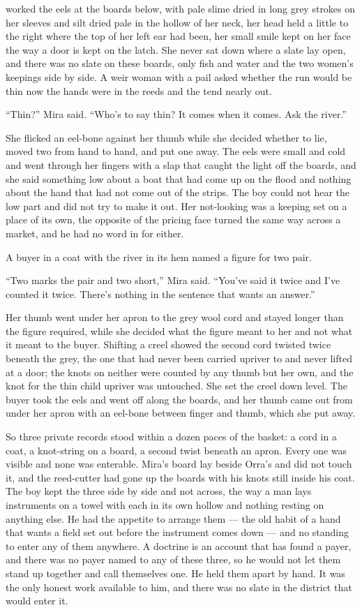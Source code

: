  worked the eels at the boards below, with pale slime dried in long grey strokes on her sleeves and silt dried pale in the hollow of her neck, her head held a little to the right where the top of her left ear had been, her small smile kept on her face the way a door is kept on the latch. She never sat down where a slate lay open, and there was no slate on these boards, only fish and water and the two women's keepings side by side. A weir woman with a pail asked whether the run would be thin now the hands were in the reeds and the tend nearly out.

“Thin?” Mira said. “Who's to say thin? It comes when it comes. Ask the river.”

She flicked an eel-bone against her thumb while she decided whether to lie, moved two from hand to hand, and put one away. The eels were small and cold and went through her fingers with a slap that caught the light off the boards, and she said something low about a boat that had come up on the flood and nothing about the hand that had not come out of the strips. The boy could not hear the low part and did not try to make it out. Her not-looking was a keeping set on a place of its own, the opposite of the pricing face turned the same way across a market, and he had no word in  for either.

A buyer in a coat with the river in its hem named a figure for two pair.

“Two marks the pair and two short,” Mira said. “You've said it twice and I've counted it twice. There's nothing in the sentence that wants an answer.”

Her thumb went under her apron to the grey wool cord and stayed longer than the figure required, while she decided what the figure meant to her and not what it meant to the buyer. Shifting a creel showed the second cord twisted twice beneath the grey, the one that had never been carried upriver to  and never lifted at a door; the knots on neither were counted by any thumb but her own, and the knot for the thin child upriver was untouched. She set the creel down level. The buyer took the eels and went off along the boards, and her thumb came out from under her apron with an eel-bone between finger and thumb, which she put away.

So three private records stood within a dozen paces of the basket: a cord in a coat, a knot-string on a board, a second twist beneath an apron. Every one was visible and none was enterable. Mira's board lay beside Orra's and did not touch it, and the reed-cutter had gone up the boards with his knots still inside his coat. The boy kept the three side by side and not across, the way a man lays instruments on a towel with each in its own hollow and nothing resting on anything else. He had the appetite to arrange them --- the old habit of a hand that wants a field set out before the instrument comes down --- and no standing to enter any of them anywhere. A doctrine is an account that has found a payer, and there was no payer named to any of these three, so he would not let them stand up together and call themselves one. He held them apart by hand. It was the only honest work available to him, and there was no slate in the district that would enter it.

